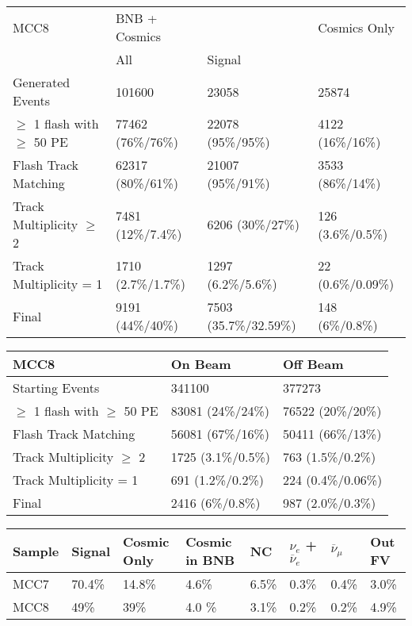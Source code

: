\documentclass[12pt]{article}
\begin{document}
\begin{table*} %
\centering
{}
 \begin{tabular}{| l | l l | l |}
 \hline
 MCC8 & BNB + Cosmics & & Cosmics Only \\ [0.1ex] 
   & All & Signal &  \\ [0.1ex] \hline
 Generated Events & 101600 & 23058 & 25874 \\ %
 $\geq$ 1 flash with $\geq$ 50 PE & 77462 (76\%/76\%) & 22078 (95\%/95\%) & 4122 (16\%/16\%)   \\ %
 Flash Track Matching & 62317 (80\%/61\%) & 21007 (95\%/91\%) & 3533 (86\%/14\%)  \\ \hline
Track Multiplicity $\geq$ 2 & 7481 (12\%/7.4\%) & 6206 (30\%/27\%) & 126 (3.6\%/0.5\%) \\ %
Track Multiplicity = 1 & 1710 (2.7\%/1.7\%) & 1297 (6.2\%/5.6\%) & 22 (0.6\%/0.09\%)   \\ %
Final  & 9191 (44\%/40\%) & 7503 (35.7\%/32.59\%) & 148 (6\%/0.8\%)   \\ \hline
\end{tabular}
\end{table*}

\begin{table*} %
\centering
{}
 \begin{tabular}{| l | l | l |}
 \hline
 MCC8 & On Beam & Off Beam \\ [0.1ex] \hline
 Starting Events & 341100 & 377273 \\ %
 $\geq$ 1 flash with $\geq$ 50 PE & 83081 (24\%/24\%) & 76522 (20\%/20\%)  \\ %
 Flash Track Matching & 56081 (67\%/16\%) & 50411 (66\%/13\%)  \\ \hline
Track Multiplicity $\geq$ 2  & 1725 (3.1\%/0.5\%) & 763 (1.5\%/0.2\%) \\ %
Track Multiplicity = 1 & 691 (1.2\%/0.2\%) & 224 (0.4\%/0.06\%)   \\ %
Final & 2416 (6\%/0.8\%) & 987 (2.0\%/0.3\%)  \\ \hline
\end{tabular}
\end{table*}

\begin{table*}
\centering
{}
 \begin{tabular}{| l | l | l |l|l|l|l|l|}
 \hline
Sample & Signal & Cosmic Only & Cosmic in BNB & NC & $\nu_e$ + $\overline{\nu}_e$ & $\overline{\nu}_{\mu}$ & Out FV  \\ [0.1ex] \hline
MCC7 & 70.4\% & 14.8\% & 4.6\% & 6.5\% & 0.3\% & 0.4\% & 3.0\% \\ \hline
MCC8 & 49\% & 39\% & 4.0 \% & 3.1\% & 0.2\% & 0.2\% & 4.9\% \\ \hline
\end{tabular}
\end{table*}
\end{document}
